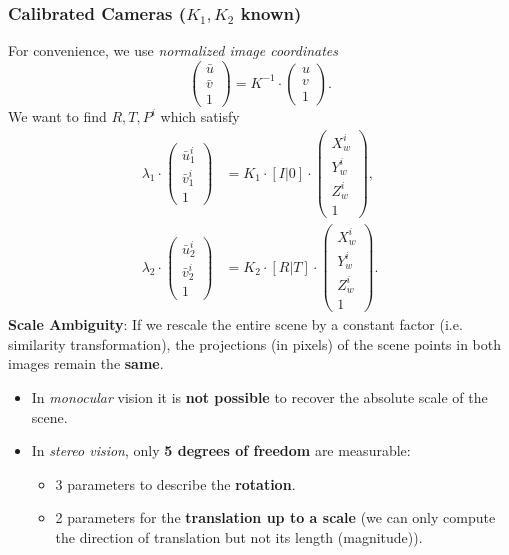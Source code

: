 \documentclass[a4paper,12 pt]{article}
\theoremstyle{definition}
\theoremstyle{remark}
\theoremstyle{definition}
\theoremstyle{definition}
\theoremstyle{definition}
\theoremstyle{remark}
\theoremstyle{definition}
\begin{document}
\subsubsection*{Calibrated Cameras ($K_1,K_2$ known)}
For convenience, we use \textit{normalized image coordinates}
\begin{equation}
\begin{pmatrix}
\bar{u}\\
\bar{v}\\
1
\end{pmatrix}=K^{-1}\cdot \begin{pmatrix}
u\\
v\\
1
\end{pmatrix}.
\end{equation}
We want to find $R,T,P^i$ which satisfy
\begin{equation}
\begin{split}
\lambda_1 \cdot \begin{pmatrix}
 \bar{u}_1^i\\
 \bar{v}_1^i\\
 1
 \end{pmatrix}&=K_1\cdot [I|0]\cdot \begin{pmatrix}
 X_w^i\\
 Y_w^i\\
 Z_w^i\\
 1
 \end{pmatrix},\\
 \lambda_2 \cdot \begin{pmatrix}
 \bar{u}_2^i\\
 \bar{v}_2^i\\
 1
 \end{pmatrix}&=K_2\cdot [R|T]\cdot \begin{pmatrix}
 X_w^i\\
 Y_w^i\\
 Z_w^i\\
 1
 \end{pmatrix}.
\end{split}
\end{equation}
\textbf{Scale Ambiguity}: If we rescale the entire scene by a constant factor (i.e. similarity transformation), the projections (in pixels) of the scene points in both images remain the \textbf{same}.
\begin{itemize}
\item In \textit{monocular} vision it is \textbf{not possible} to recover the absolute scale of the scene.
\item In \textit{stereo vision}, only \textbf{5 degrees of freedom} are measurable:
\begin{itemize}
\item 3 parameters to describe the \textbf{rotation}.
\item 2 parameters for the \textbf{translation up to a scale} (we can only compute the direction of translation but not its length (magnitude)).
\end{itemize}
\end{itemize}
\end{document}
